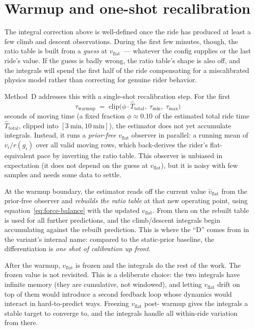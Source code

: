 \documentclass[11pt,a4paper]{article}
\begin{document}
\section{Warmup and one-shot recalibration}
\label{sec:warmup}

The integral correction above is well-defined once the ride has
produced at least a few climb and descent observations. During the
first few minutes, though, the ratio table is built from a
\emph{guess} at $v_{\text{flat}}$~--- whatever the config supplies or
the last ride's value. If the guess is badly wrong, the ratio table's
shape is also off, and the integrals will spend the first half of the
ride compensating for a miscalibrated physics model rather than
correcting for genuine rider behavior.

Method~D addresses this with a single-shot recalibration step. For
the first
\begin{equation}
\tau_{\text{warmup}} \;=\;
\mathrm{clip}\!\big(\phi \cdot \hat{T}_{\text{total}},\;
  \tau_{\min},\; \tau_{\max}\big)
\end{equation}
seconds of moving time (a fixed fraction $\phi \approx 0.10$ of the
estimated total ride time $\hat{T}_{\text{total}}$, clipped into
$[\SI{3}{\minute}, \SI{10}{\minute}]$), the estimator does not yet
accumulate integrals. Instead, it runs a \emph{prior-free}
$v_{\text{flat}}$ observer in parallel: a running mean of
$v_i / r(g_i)$ over all valid moving rows, which back-derives the
rider's flat-equivalent pace by inverting the ratio table. This
observer is unbiased in expectation (it does not depend on the guess
at $v_{\text{flat}}$), but it is noisy with few samples and needs
some data to settle.

At the warmup boundary, the estimator reads off the current value
$\hat{v}_{\text{flat}}$ from the prior-free observer and \emph{rebuilds
the ratio table} at that new operating point, using
equation~\eqref{eq:force-balance} with the updated $v_{\text{flat}}$.
From then on the rebuilt table is used for all further predictions,
and the climb/descent integrals begin accumulating against the
rebuilt prediction. This is where the ``D'' comes from in the
variant's internal name: compared to the static-prior baseline, the
differentiation is \emph{one shot of calibration up front}.

After the warmup, $v_{\text{flat}}$ is frozen and the integrals do
the rest of the work. The frozen value is not revisited. This is a
deliberate choice: the two integrals have infinite memory (they are
cumulative, not windowed), and letting $v_{\text{flat}}$ drift on top
of them would introduce a second feedback loop whose dynamics would
interact in hard-to-predict ways. Freezing $v_{\text{flat}}$ post-
warmup gives the integrals a stable target to converge to, and the
integrals handle all within-ride variation from there.
\end{document}
